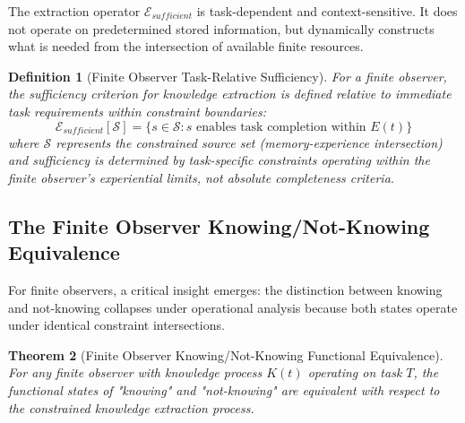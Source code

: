 \documentclass{article}
\newtheorem{theorem}{Theorem}[section]
\newtheorem{definition}[theorem]{Definition}
\begin{document}
The extraction operator $\mathcal{E}_{sufficient}$ is task-dependent and context-sensitive. It does not operate on predetermined stored information, but dynamically constructs what is needed from the intersection of available finite resources.

\begin{definition}[Finite Observer Task-Relative Sufficiency]
For a finite observer, the sufficiency criterion for knowledge extraction is defined relative to immediate task requirements within constraint boundaries:
\begin{equation}
\mathcal{E}_{sufficient}[\mathcal{S}] = \{s \in \mathcal{S} : s \text{ enables task completion within } E(t)\}
\end{equation}
where $\mathcal{S}$ represents the constrained source set (memory-experience intersection) and sufficiency is determined by task-specific constraints operating within the finite observer's experiential limits, not absolute completeness criteria.
\end{definition}

\subsection{The Finite Observer Knowing/Not-Knowing Equivalence}

For finite observers, a critical insight emerges: the distinction between knowing and not-knowing collapses under operational analysis because both states operate under identical constraint intersections.

\begin{theorem}[Finite Observer Knowing/Not-Knowing Functional Equivalence]
For any finite observer with knowledge process $K(t)$ operating on task $T$, the functional states of "knowing" and "not-knowing" are equivalent with respect to the constrained knowledge extraction process.
\end{theorem}
\end{document}
